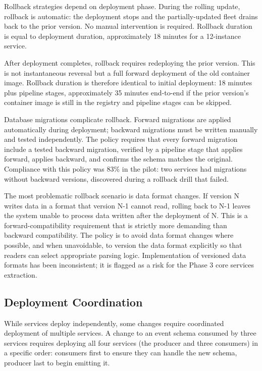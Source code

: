 Rollback strategies depend on deployment phase. During the rolling update, rollback is automatic: the deployment stops and the partially-updated fleet drains back to the prior version. No manual intervention is required. Rollback duration is equal to deployment duration, approximately 18 minutes for a 12-instance service.

After deployment completes, rollback requires redeploying the prior version. This is not instantaneous reversal but a full forward deployment of the old container image. Rollback duration is therefore identical to initial deployment: 18 minutes plus pipeline stages, approximately 35 minutes end-to-end if the prior version's container image is still in the registry and pipeline stages can be skipped.

Database migrations complicate rollback. Forward migrations are applied automatically during deployment; backward migrations must be written manually and tested independently. The policy requires that every forward migration include a tested backward migration, verified by a pipeline stage that applies forward, applies backward, and confirms the schema matches the original. Compliance with this policy was 83\% in the pilot: two services had migrations without backward versions, discovered during a rollback drill that failed.

The most problematic rollback scenario is data format changes. If version N writes data in a format that version N-1 cannot read, rolling back to N-1 leaves the system unable to process data written after the deployment of N. This is a forward-compatibility requirement that is strictly more demanding than backward compatibility. The policy is to avoid data format changes where possible, and when unavoidable, to version the data format explicitly so that readers can select appropriate parsing logic. Implementation of versioned data formats has been inconsistent; it is flagged as a risk for the Phase 3 core services extraction.

\subsection{Deployment Coordination}

While services deploy independently, some changes require coordinated deployment of multiple services. A change to an event schema consumed by three services requires deploying all four services (the producer and three consumers) in a specific order: consumers first to ensure they can handle the new schema, producer last to begin emitting it.

